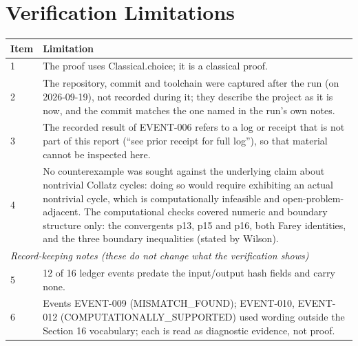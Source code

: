 \documentclass[11pt]{article}
\begin{document}
\section{Verification Limitations}
\begin{longtable}{p{}p{}}
\toprule Item & Limitation \\ \midrule \endhead
1 & The proof uses Classical.choice; it is a classical proof. \\
2 & The repository, commit and toolchain were captured after the run (on 2026-09-19), not recorded during it; they describe the project as it is now, and the commit matches the one named in the run's own notes. \\
3 & The recorded result of EVENT-006 refers to a log or receipt that is not part of this report (``see prior receipt for full log''), so that material cannot be inspected here. \\
4 & No counterexample was sought against the underlying claim about nontrivial Collatz cycles: doing so would require exhibiting an actual nontrivial cycle, which is computationally infeasible and open-problem-adjacent. The computational checks covered numeric and boundary structure only: the convergents p13, p15 and p16, both Farey identities, and the three boundary inequalities (stated by Wilson). \\
\midrule \multicolumn{2}{l}{\textit{Record-keeping notes (these do not change what the verification shows)}} \\ \midrule
5 & 12 of 16 ledger events predate the input/output hash fields and carry none. \\
6 & Events EVENT-009 (MISMATCH\_FOUND); EVENT-010, EVENT-012 (COMPUTATIONALLY\_SUPPORTED) used wording outside the Section 16 vocabulary; each is read as diagnostic evidence, not proof. \\
\bottomrule
\end{longtable}
\end{document}
